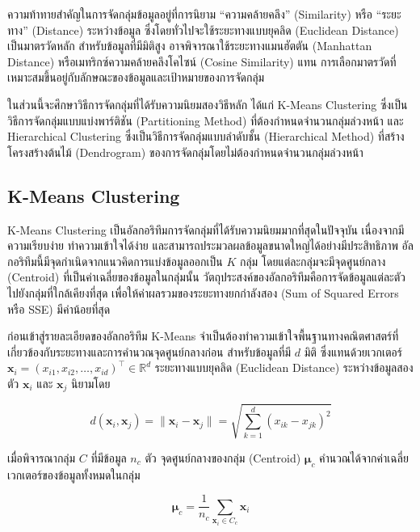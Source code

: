 ความท้าทายสำคัญในการจัดกลุ่มข้อมูลอยู่ที่การนิยาม ``ความคล้ายคลึง'' (Similarity) หรือ ``ระยะทาง'' (Distance) ระหว่างข้อมูล ซึ่งโดยทั่วไปจะใช้ระยะทางแบบยุคลิด (Euclidean Distance) เป็นมาตรวัดหลัก สำหรับข้อมูลที่มีมิติสูง อาจพิจารณาใช้ระยะทางแมนฮัตตัน (Manhattan Distance) หรือเมทริกซ์ความคล้ายคลึงโคไซน์ (Cosine Similarity) แทน การเลือกมาตรวัดที่เหมาะสมขึ้นอยู่กับลักษณะของข้อมูลและเป้าหมายของการจัดกลุ่ม

ในส่วนนี้จะศึกษาวิธีการจัดกลุ่มที่ได้รับความนิยมสองวิธีหลัก ได้แก่ K-Means Clustering ซึ่งเป็นวิธีการจัดกลุ่มแบบแบ่งพาร์ติชัน (Partitioning Method) ที่ต้องกำหนดจำนวนกลุ่มล่วงหน้า และ Hierarchical Clustering ซึ่งเป็นวิธีการจัดกลุ่มแบบลำดับชั้น (Hierarchical Method) ที่สร้างโครงสร้างต้นไม้ (Dendrogram) ของการจัดกลุ่มโดยไม่ต้องกำหนดจำนวนกลุ่มล่วงหน้า

\subsection{K-Means Clustering}

K-Means Clustering เป็นอัลกอริทึมการจัดกลุ่มที่ได้รับความนิยมมากที่สุดในปัจจุบัน เนื่องจากมีความเรียบง่าย ทำความเข้าใจได้ง่าย และสามารถประมวลผลข้อมูลขนาดใหญ่ได้อย่างมีประสิทธิภาพ อัลกอริทึมนี้มีจุดกำเนิดจากแนวคิดการแบ่งข้อมูลออกเป็น $K$ กลุ่ม โดยแต่ละกลุ่มจะมีจุดศูนย์กลาง (Centroid) ที่เป็นค่าเฉลี่ยของข้อมูลในกลุ่มนั้น วัตถุประสงค์ของอัลกอริทึมคือการจัดข้อมูลแต่ละตัวไปยังกลุ่มที่ใกล้เคียงที่สุด เพื่อให้ค่าผลรวมของระยะทางยกกำลังสอง (Sum of Squared Errors หรือ SSE) มีค่าน้อยที่สุด

ก่อนเข้าสู่รายละเอียดของอัลกอริทึม K-Means จำเป็นต้องทำความเข้าใจพื้นฐานทางคณิตศาสตร์ที่เกี่ยวข้องกับระยะทางและการคำนวณจุดศูนย์กลางก่อน สำหรับข้อมูลที่มี $d$ มิติ ซึ่งแทนด้วยเวกเตอร์ $\mathbf{x}_i = (x_{i1}, x_{i2}, \ldots, x_{id})^\top \in \mathbb{R}^d$ ระยะทางแบบยุคลิด (Euclidean Distance) ระหว่างข้อมูลสองตัว $\mathbf{x}_i$ และ $\mathbf{x}_j$ นิยามโดย

\begin{equation}
d(\mathbf{x}_i, \mathbf{x}_j) = \|\mathbf{x}_i - \mathbf{x}_j\| = \sqrt{\sum_{k=1}^{d} (x_{ik} - x_{jk})^2}
\end{equation}

เมื่อพิจารณากลุ่ม $C$ ที่มีข้อมูล $n_c$ ตัว จุดศูนย์กลางของกลุ่ม (Centroid) $\boldsymbol{\mu}_c$ คำนวณได้จากค่าเฉลี่ยเวกเตอร์ของข้อมูลทั้งหมดในกลุ่ม

\begin{equation}
\boldsymbol{\mu}_c = \frac{1}{n_c} \sum_{\mathbf{x}_i \in C_c} \mathbf{x}_i
\end{equation}

